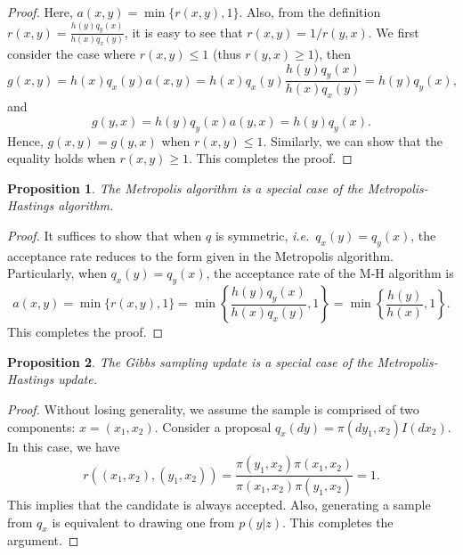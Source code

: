 \documentclass[a4paper,11pt]{article}
\newtheorem{proposition}{Proposition}
\begin{document}
\begin{proof}
    Here, $a(x, y) = \min\{r(x, y), 1\}$. Also, from the definition $r(x, y) = \frac{h(y) q_y(x)}{h(x) q_x(y)}$, it is easy to see that $r(x, y) = 1 / r(y, x)$. 
    We first consider the case where $r(x, y) \le 1$ (thus $r(y, x) \ge 1$), then 
    \begin{equation}
        g(x, y) 
        = h(x) q_x(y) a(x, y) 
        = h(x) q_x(y) \frac{h(y) q_y(x)}{h(x) q_x(y)}
        = h(y) q_y(x),
    \end{equation}
    and
    \begin{equation}
        g(y, x) = h(y) q_y(x) a(y, x) = h(y) q_y(x).
    \end{equation}
    Hence, $g(x, y) = g(y, x)$ when $r(x, y) \le 1$. Similarly, we can show that the equality holds when $r(x, y) \ge 1$. 
    This completes the proof.
\end{proof}

\begin{proposition}
    The Metropolis algorithm is a special case of the Metropolis-Hastings algorithm.
\end{proposition}

\begin{proof}
    It suffices to show that when $q$ is symmetric, \textit{i.e.}~$q_x(y) = q_y(x)$, the acceptance rate reduces to the form given in the Metropolis algorithm.
    Particularly, when $q_x(y) = q_y(x)$, the acceptance rate of the M-H algorithm is 
    \begin{equation}
        a(x, y) = \min \{ r(x, y), 1 \} 
        = \min \left\{ \frac{h(y) q_y(x)}{h(x) q_x(y)}, 1\right\} = \min \left\{ \frac{h(y)}{h(x)}, 1\right\}.
    \end{equation}
    This completes the proof.
\end{proof}

\begin{proposition}
    The Gibbs sampling update is a special case of the Metropolis-Hastings update.
\end{proposition}


\begin{proof}
    Without losing generality, we assume the sample is comprised of two components: $x = (x_1, x_2)$. Consider a proposal $q_x(dy) = \pi(dy_1, x_2) I(dx_2) $. In this case, we have
    \begin{equation}
        r((x_1, x_2), (y_1, x_2)) = \frac{\pi(y_1, x_2) \pi(x_1, x_2)}{\pi(x_1, x_2) \pi(y_1, x_2)} = 1.
    \end{equation}
    This implies that the candidate is always accepted. Also, generating a sample from $q_x$ is equivalent to drawing one from $p(y|z)$. This completes the argument.
\end{proof}
\end{document}
